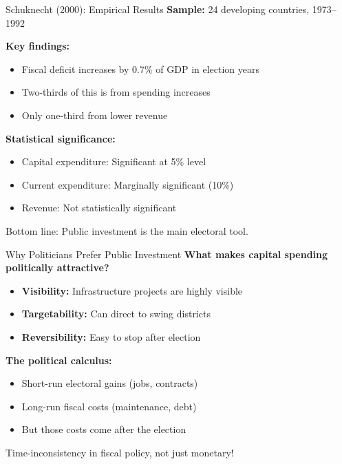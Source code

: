 \documentclass[10pt]{beamer}
\begin{document}
\begin{frame}{Schuknecht (2000): Empirical Results}
\textbf{Sample:} 24 developing countries, 1973–1992

\vspace{0.3cm}
\textbf{Key findings:}
\begin{itemize}
\item Fiscal deficit increases by \alert{0.7\% of GDP} in election years
\item \alert{Two-thirds} of this is from spending increases
\item Only one-third from lower revenue
\end{itemize}

\vspace{0.3cm}
\textbf{Statistical significance:}
\begin{itemize}
\item \alert{Capital expenditure:} Significant at 5\% level
\item Current expenditure: Marginally significant (10\%)
\item Revenue: Not statistically significant
\end{itemize}

\vspace{0.3cm}
\alert{Bottom line:} Public investment is the main electoral tool.
\end{frame}

\begin{frame}{Why Politicians Prefer Public Investment}
\textbf{What makes capital spending politically attractive?}
\begin{itemize}
\item \textbf{Visibility:} Infrastructure projects are highly visible
\item \textbf{Targetability:} Can direct to swing districts
\item \textbf{Reversibility:} Easy to stop after election
\end{itemize}

\vspace{0.3cm}
\textbf{The political calculus:}
\begin{itemize}
\item Short-run electoral gains (jobs, contracts)
\item Long-run fiscal costs (maintenance, debt)
\item But those costs come after the election
\end{itemize}

\vspace{0.3cm}
\alert{Time-inconsistency in fiscal policy, not just monetary!}
\end{frame}
\end{document}
